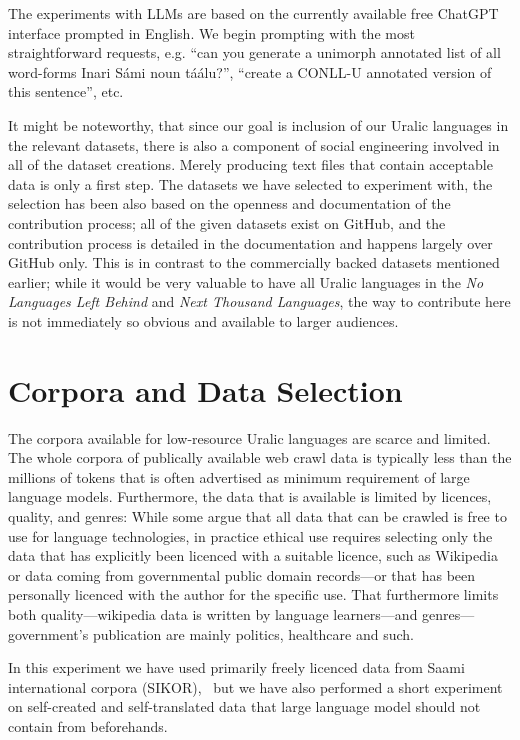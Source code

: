 \documentclass[free]{flammie}
\begin{document}
The experiments with LLMs are based on the currently available free ChatGPT
interface prompted in English. We begin prompting with the most straightforward
requests, e.g. ``can you generate a unimorph annotated list of all word-forms
Inari Sámi noun táálu?'', ``create a CONLL-U annotated version of this
sentence'', etc.

It might be noteworthy, that since our goal is inclusion of our Uralic languages
in the relevant datasets, there is also a component of social engineering
involved in all of the dataset creations.  Merely producing text files that
contain acceptable data is only a first step.  The datasets we have selected to
experiment with, the selection has been also based on the openness and
documentation of the contribution process; all of the given datasets exist on
GitHub, and the contribution process is detailed in the documentation and
happens largely over GitHub only. This is in contrast to the commercially backed
datasets mentioned earlier; while it would be very valuable to have all Uralic
languages in the \textit{No Languages Left Behind} and \textit{Next Thousand
Languages}, the way to contribute here is not immediately so obvious and
available to larger audiences.

\section{Corpora and Data Selection}

The corpora available for low-resource Uralic languages are scarce and limited.
The whole corpora of publically available web crawl data is typically less than
the millions of tokens that is often advertised as minimum requirement of large
language models.  Furthermore, the data that is available is limited by
licences, quality, and genres: While some argue that all data that can be
crawled is free to use for language technologies, in practice ethical use
requires selecting only the data that has explicitly been licenced with a
suitable licence, such as Wikipedia or data coming from governmental public
domain records---or that has been personally licenced with the author for the
specific use.  That furthermore limits both quality---wikipedia data is written
by language learners---and genres---government's publication are mainly
politics, healthcare and such.

In this experiment we have used primarily freely licenced data from Saami
international corpora (SIKOR),~\cite{sikor_06.11.2018} but we have also
performed a short experiment on self-created and self-translated data that large
language model should not contain from beforehands.
\end{document}
